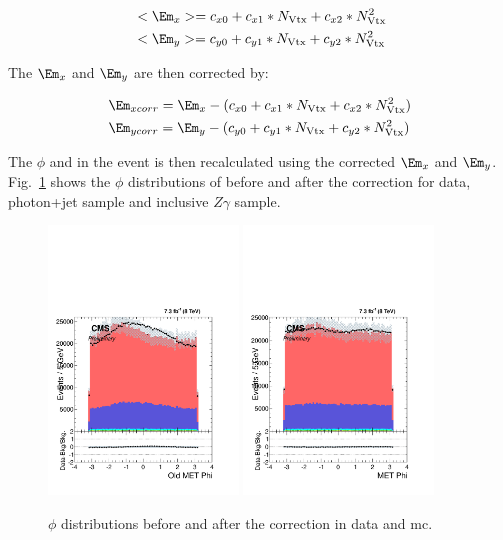 \begin{equation}
\begin{split}
&<\Em_x> = c_{x0} + c_{x1}*N_\mathrm{Vtx} + c_{x2}*N_\mathrm{Vtx}^2  \\
\centering
&<\Em_y> = c_{y0} + c_{y1}*N_\mathrm{Vtx} + c_{y2}*N_\mathrm{Vtx}^2
\end{split}
\end{equation}


The $\Em_x$ and $\Em_y$ are then corrected by:

\begin{equation}
\begin{split}
&\Em_{xcorr} = \Em_x - (c_{x0} + c_{x1}*N_\mathrm{Vtx} + c_{x2}*N_\mathrm{Vtx}^2) \\
&\Em_{ycorr} = \Em_y - (c_{y0} + c_{y1}*N_\mathrm{Vtx} + c_{y2}*N_\mathrm{Vtx}^2)
\end{split}
\end{equation}

The $\phi$ and \met in the event is then recalculated using the corrected $\Em_x$ and $\Em_y$. Fig.~\ref{fig:phicorr} shows the $\phi$ distributions of \met before and after the correction for data, photon+jet sample and inclusive $Z\gamma$ sample.

\begin{figure}[!h]
 \centering
  {\label{fig:a}\includegraphics[width=0.45\textwidth]{analysis_figs/before_mphi.pdf}}
  {\label{fig:c}\includegraphics[width=0.45\textwidth]{analysis_figs/after_mphi.pdf}}
 \caption{ $\phi$ distributions before and after the correction in data and mc.}
 \label{fig:phicorr}
\end{figure}

